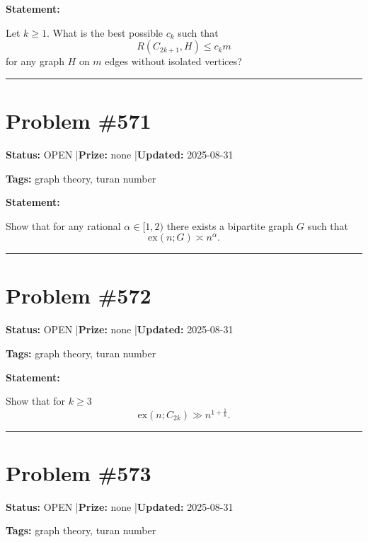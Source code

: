 \documentclass{article}
\begin{document}
\noindent\textbf{Statement:}

Let $k\geq 1$. What is the best possible $c_k$ such that\[R(C_{2k+1},H)\leq c_k m\]for any graph $H$ on $m$ edges without isolated vertices?

\noindent\rule{\linewidth}{0.4pt}


\section{Problem \#571}
\label{prob:571}

\noindent\textbf{Status:} OPEN \quad|\quad \textbf{Prize:} none \quad|\quad \textbf{Updated:} 2025-08-31

\noindent\textbf{Tags:} graph theory, turan number

\medskip

\noindent\textbf{Statement:}

Show that for any rational $\alpha \in [1,2)$ there exists a bipartite graph $G$ such that\[\mathrm{ex}(n;G)\asymp n^{\alpha}.\]

\noindent\rule{\linewidth}{0.4pt}


\section{Problem \#572}
\label{prob:572}

\noindent\textbf{Status:} OPEN \quad|\quad \textbf{Prize:} none \quad|\quad \textbf{Updated:} 2025-08-31

\noindent\textbf{Tags:} graph theory, turan number

\medskip

\noindent\textbf{Statement:}

Show that for $k\geq 3$\[\mathrm{ex}(n;C_{2k})\gg n^{1+\frac{1}{k}}.\]

\noindent\rule{\linewidth}{0.4pt}


\section{Problem \#573}
\label{prob:573}

\noindent\textbf{Status:} OPEN \quad|\quad \textbf{Prize:} none \quad|\quad \textbf{Updated:} 2025-08-31

\noindent\textbf{Tags:} graph theory, turan number
\end{document}
